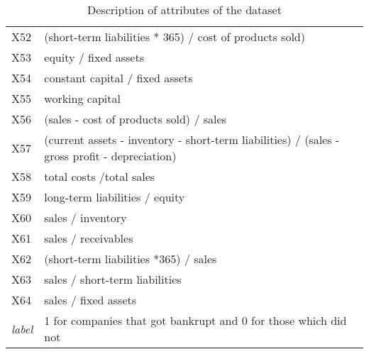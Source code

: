 \begin{table*}
\begin{tabular}[t]{|p{0.8cm}|p{6cm}| }
    X52	&	(short-term liabilities * 365) / cost of products sold) \\
    X53	&	equity / fixed assets \\
    X54	&	constant capital / fixed assets \\
    X55	&	working capital \\
    X56	&	(sales - cost of products sold) / sales \\
    X57	&	(current assets - inventory - short-term liabilities) / (sales - gross profit - depreciation) \\
    X58	&	total costs /total sales \\
    X59	&	long-term liabilities / equity \\
    X60	&	sales / inventory \\
    X61	&	sales / receivables \\
    X62	&	(short-term liabilities *365) / sales \\
    X63	&	sales / short-term liabilities \\
    X64	&	sales / fixed assets \\
     \hline
    \textit{label} & 1 for companies that got bankrupt and 0 for those which did not \\
    \hline
\end{tabular}

\caption{\label{tab::dataset_attr_desc__old} Description of attributes of the dataset}
\end{table*}
